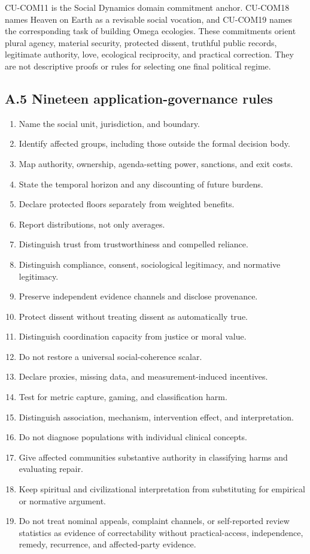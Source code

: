 \documentclass[
  11pt,
]{article}
\providecommand{\tightlist}{%
  \setlength{\itemsep}{0pt}\setlength{\parskip}{0pt}}
\begin{document}
CU-COM11 is the Social Dynamics domain commitment anchor. CU-COM18 names
Heaven on Earth as a revisable social vocation, and CU-COM19 names the
corresponding task of building Omega ecologies. These commitments orient
plural agency, material security, protected dissent, truthful public
records, legitimate authority, love, ecological reciprocity, and
practical correction. They are not descriptive proofs or rules for
selecting one final political regime.

\subsection{A.5 Nineteen application-governance
rules}\label{a.5-nineteen-application-governance-rules}

\begin{enumerate}
\def\labelenumi{\arabic{enumi}.}
\tightlist
\item
  Name the social unit, jurisdiction, and boundary.
\item
  Identify affected groups, including those outside the formal decision
  body.
\item
  Map authority, ownership, agenda-setting power, sanctions, and exit
  costs.
\item
  State the temporal horizon and any discounting of future burdens.
\item
  Declare protected floors separately from weighted benefits.
\item
  Report distributions, not only averages.
\item
  Distinguish trust from trustworthiness and compelled reliance.
\item
  Distinguish compliance, consent, sociological legitimacy, and
  normative legitimacy.
\item
  Preserve independent evidence channels and disclose provenance.
\item
  Protect dissent without treating dissent as automatically true.
\item
  Distinguish coordination capacity from justice or moral value.
\item
  Do not restore a universal social-coherence scalar.
\item
  Declare proxies, missing data, and measurement-induced incentives.
\item
  Test for metric capture, gaming, and classification harm.
\item
  Distinguish association, mechanism, intervention effect, and
  interpretation.
\item
  Do not diagnose populations with individual clinical concepts.
\item
  Give affected communities substantive authority in classifying harms
  and evaluating repair.
\item
  Keep spiritual and civilizational interpretation from substituting for
  empirical or normative argument.
\item
  Do not treat nominal appeals, complaint channels, or self-reported
  review statistics as evidence of correctability without
  practical-access, independence, remedy, recurrence, and affected-party
  evidence.
\end{enumerate}
\end{document}
